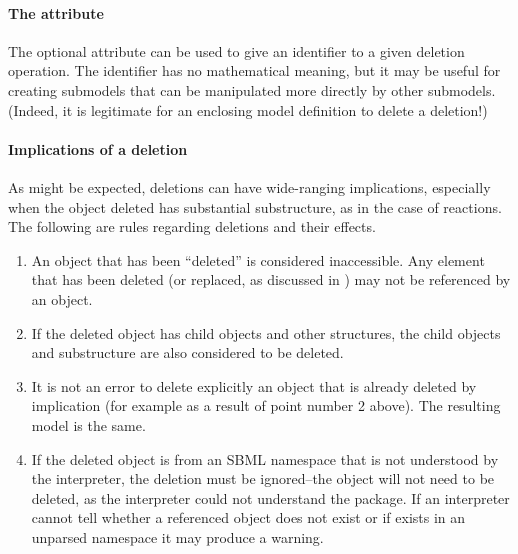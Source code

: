 \paragraph{The \fixttspace{} attribute}

The optional attribute   can be used to give an identifier to a given deletion operation.  The identifier has no mathematical meaning, but it may be useful for creating submodels that can be manipulated more directly by other submodels.  (Indeed, it is legitimate for an enclosing model definition to delete a deletion!)


\paragraph{Implications of a deletion}

As might be expected, deletions can have wide-ranging implications, especially when the object deleted has substantial substructure, as in the case of reactions.  The following are rules regarding deletions and their effects.

\begin{enumerate}

\item An object that has been ``deleted'' is considered inaccessible. Any element that has been deleted (or replaced, as discussed in ) may not be referenced by an \SBaseRef object.

\item If the deleted object has child objects and other structures, the child objects and substructure are also considered to be deleted.

\item It is not an error to delete explicitly an object that is already deleted by implication (for example as a result of point number 2 above).  The resulting model is the same.

\item If the deleted object is from an SBML namespace that is not understood by the interpreter, the deletion must be ignored--the  object will not need to be deleted, as the interpreter could not understand the package.  If an interpreter cannot tell whether  a referenced object does not exist or if exists in an unparsed namespace it may produce a warning.

\end{enumerate}

